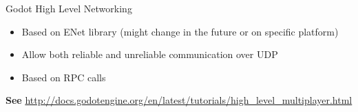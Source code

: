 \begin{frame}{Godot High Level Networking}

\begin{itemize}
    \item Based on ENet library (might change in the future or on specific platform)
    \item Allow both reliable and unreliable communication over UDP
    \item Based on RPC calls
\end{itemize}

\vspace{1cm}

\tiny{
\textbf{See} \href{http://docs.godotengine.org/en/latest/tutorials/high\_level\_multiplayer.html}{http://docs.godotengine.org/en/latest/tutorials/high\_level\_multiplayer.html}
}

\end{frame}